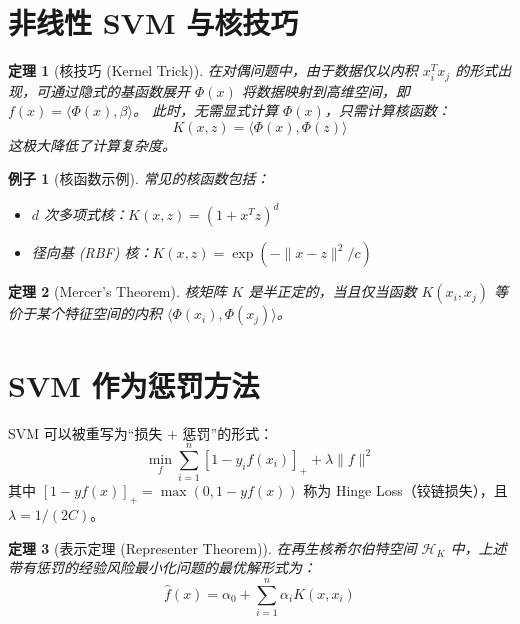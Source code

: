 \documentclass[UTF8]{ctexart}
\newtheorem{theorem}{定理}
\newtheorem{example}{例子}
\begin{document}
\section{非线性 SVM 与核技巧}
\begin{theorem}[核技巧 (Kernel Trick)]
在对偶问题中，由于数据仅以内积 $x_i^T x_j$ 的形式出现，可通过隐式的基函数展开 $\Phi(x)$ 将数据映射到高维空间，即 $f(x) = \langle \Phi(x), \beta \rangle$。
此时，无需显式计算 $\Phi(x)$，只需计算核函数：
$$ K(x, z) = \langle \Phi(x), \Phi(z) \rangle $$
这极大降低了计算复杂度。
\end{theorem}

\begin{example}[核函数示例]
常见的核函数包括：
\begin{itemize}
    \item $d$ 次多项式核：$K(x, z) = (1 + x^Tz)^d$
    \item 径向基 (RBF) 核：$K(x, z) = \exp(-\|x - z\|^2/c)$
\end{itemize}
\end{example}

\begin{theorem}[Mercer's Theorem]
核矩阵 $K$ 是半正定的，当且仅当函数 $K(x_i, x_j)$ 等价于某个特征空间的内积 $\langle \Phi(x_i), \Phi(x_j) \rangle$。
\end{theorem}

\section{SVM 作为惩罚方法}
SVM 可以被重写为“损失 + 惩罚”的形式：
$$ \min_{f} \sum_{i=1}^n [1 - y_if(x_i)]_+ + \lambda \|f\|^2 $$
其中 $[1 - yf(x)]_+ = \max(0, 1 - yf(x))$ 称为 Hinge Loss（铰链损失），且 $\lambda = 1/(2C)$。

\begin{theorem}[表示定理 (Representer Theorem)]
在再生核希尔伯特空间 $\mathcal{H}_K$ 中，上述带有惩罚的经验风险最小化问题的最优解形式为：
$$ \hat{f}(x) = \alpha_0 + \sum_{i=1}^n \alpha_i K(x, x_i) $$
\end{theorem}
\end{document}
